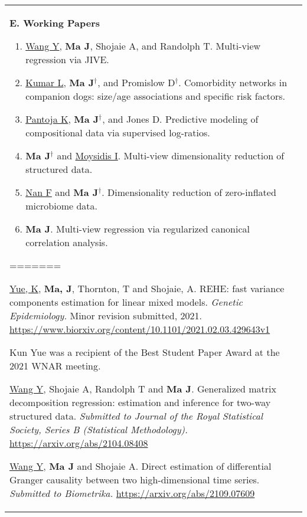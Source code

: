 \documentclass[10pt]{article}
\begin{document}
\begin{table}[H]
\begin{tabular}{p{1.6cm}p{12cm}}
\textbf{E. Working Papers}
\begin{enumerate}\setcounter{enumi}{0}
\item \underline{Wang Y}, \textbf{Ma J}, Shojaie A, and Randolph T. Multi-view regression via JIVE. 
\item \underline{Kumar L}, \textbf{Ma J}$^{\dagger}$, and Promislow D$^{\dagger}$. Comorbidity networks in companion dogs: size/age associations and specific risk factors. 
\item \underline{Pantoja K}, \textbf{Ma J}$^{\dagger}$, and Jones D. Predictive modeling of compositional data via supervised log-ratios.
\item \textbf{Ma J}$^{\dagger}$ and \underline{Moysidis I}. Multi-view dimensionality reduction of structured data. 
\item \underline{Nan F} and \textbf{Ma J}$^{\dagger}$. Dimensionality reduction of zero-inflated microbiome data. 
\item \textbf{Ma J}. Multi-view regression via regularized canonical correlation analysis. 
\end{enumerate}
=======
\item \underline{Yue, K}, \textbf{Ma, J}, Thornton, T and Shojaie, A. REHE: fast variance components estimation for linear mixed models. {\it Genetic Epidemiology.} Minor revision submitted, 2021. \url{https://www.biorxiv.org/content/10.1101/2021.02.03.429643v1}
\begin{myitemize}
\item Kun Yue was a recipient of the Best Student Paper Award at the 2021 WNAR meeting. 
\end{myitemize}
\item \underline{Wang Y}, Shojaie A, Randolph T and \textbf{Ma J}. Generalized matrix decomposition regression: estimation and inference for two-way structured data. {\it Submitted to Journal of the Royal Statistical Society, Series B (Statistical Methodology).} \url{https://arxiv.org/abs/2104.08408}
\item \underline{Wang Y}, \textbf{Ma J} and Shojaie A. Direct estimation of differential Granger causality between two high-dimensional time series. {\it Submitted to Biometrika.} \url{https://arxiv.org/abs/2109.07609}
\end{enumerate}


\end{tabular}
\end{table}
\end{document}
